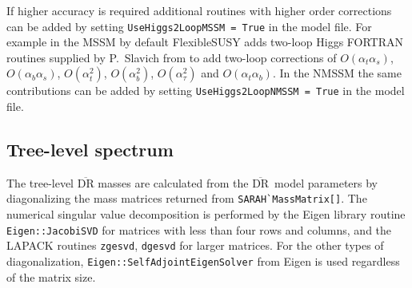 \documentclass[final,3p,11pt,pdflatex]{elsarticle}
\makeatletter
\newcommand{\fs}{FlexibleSUSY\@\xspace}
\newcommand{\code}[1]{\lstinline|#1|}  %
\newcommand{\textoverline}[1]{$\overline{\mbox{#1}}$}
\newcommand{\DRbar}{\textoverline{DR}\xspace}
\def\at{\alpha_t}
\def\ab{\alpha_b}
\def\as{\alpha_s}
\def\atau{\alpha_{\tau}}
\def\oatab{O(\at\ab)}
\def\oatas{O(\at\as)}
\def\oabas{O(\ab\as)}
\def\oatq{O(\at^2)}
\def\oabq{O(\ab^2)}
\def\oatauq{O(\atau^2)}
\makeatother
\begin{document}
If higher accuracy is required additional routines with higher order
corrections can be added by setting \code{UseHiggs2LoopMSSM = True}
in the model file.  For example in the MSSM by default \fs adds
two-loop Higgs FORTRAN routines supplied by P.~Slavich from
\cite{Dedes:2002dy,Dedes:2003km}
to add two-loop corrections of $\oatas$, $\oabas$, $\oatq$,
$\oabq$, $\oatauq$ and $\oatab$.  In the NMSSM the same contributions
can be added by setting \code{UseHiggs2LoopNMSSM = True} in the model
file.

\subsection{Tree-level spectrum}
\label{sec:TreeLevelSpectrum}
The tree-level \DRbar masses are calculated from the \DRbar\ model
parameters by diagonalizing the mass matrices returned from
\code{SARAH`MassMatrix[]}.  The numerical singular value decomposition
is performed by the Eigen library routine \code{Eigen::JacobiSVD} for
matrices with less than four rows and columns, and the LAPACK routines
\code{zgesvd}, \code{dgesvd} for larger matrices.  For the other types
of diagonalization, \code{Eigen::SelfAdjointEigenSolver} from Eigen is
used regardless of the matrix size.
\end{document}
